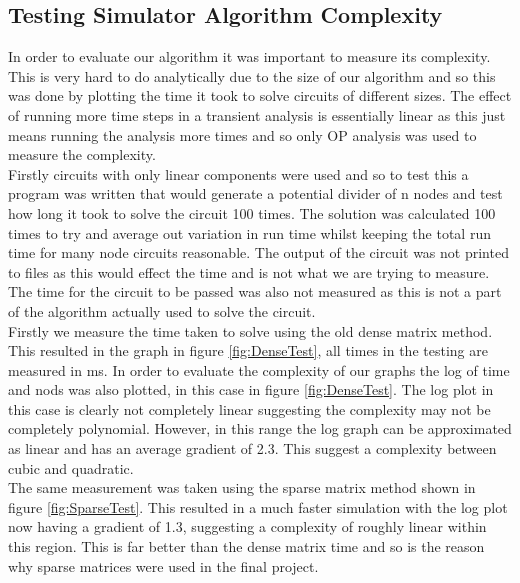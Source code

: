 \documentclass{article}
\begin{document}
\subsection{Testing Simulator Algorithm Complexity}
In order to evaluate our algorithm it was important to measure its complexity. This is very hard to do analytically due to the size of our algorithm and so this was done by plotting the time it took to solve circuits of different sizes. The effect of running more time steps in a transient analysis is essentially linear as this just means running the analysis more times and so only OP analysis was used to measure the complexity.\\ Firstly circuits with only linear components were used and so to test this a program was written that would generate a potential divider of n nodes and test how long it took to solve the circuit 100 times. The solution was calculated 100 times to try and average out variation in run time whilst keeping the total run time for many node circuits reasonable. The output of the circuit was not printed to files as this would effect the time and is not what we are trying to measure. The time for the circuit to be passed was also not measured as this is not a part of the algorithm actually used to solve the circuit.\\ Firstly we measure the time taken to solve using the old dense matrix method. This resulted in the graph in figure \ref{fig:DenseTest}, all times in the testing are measured in ms. In order to evaluate the complexity of our graphs the log of time and nods was also plotted, in this case in figure \ref{fig:DenseTest}. The log plot in this case is clearly not completely linear suggesting the complexity may not be completely polynomial. However, in this range the log graph can be approximated as linear and has an average gradient of 2.3. This suggest a complexity between cubic and quadratic.\\ The same measurement was taken using the sparse matrix method shown in figure \ref{fig:SparseTest}. This resulted in a much faster simulation with the log plot now having a gradient of 1.3, suggesting a complexity of roughly linear within this region. This is far better than the dense matrix time and so is the reason why sparse matrices were used in the final project. \\
\end{document}
